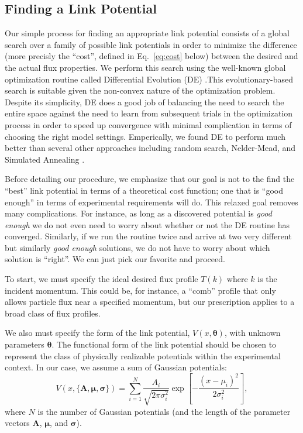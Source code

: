\documentclass[twocolumn,amsmath,amssymb,showpacs,prl,superscriptaddress,aps]{revtex4-1}
\begin{document}
\subsection{Finding a Link Potential}
Our simple process for finding an appropriate link potential consists of a global search over a family of possible link potentials in order to minimize the difference (more precisly the ``cost'', defined in Eq.~\eqref{eq:cost} below) between the desired and the actual flux properties. We perform this search using the well-known global optimization routine called Differential Evolution (DE) \cite{original DE paper}.This evolutionary-based search is suitable given the non-convex nature of the optimization problem. Despite its simplicity, DE does a good job of balancing the need to search the entire space against the need to learn from subsequent trials in the optimization process in order to speed up convergence with minimal complication in terms of choosing the right model settings. Emperically, we found DE to perform much better than several other approaches including random search, Nelder-Mead, and Simulated Annealing \cite{Tests performed using mathematica}.

Before detailing our procedure, we emphasize that our goal is not to the find the ``best'' link potential in terms of a theoretical cost function; one that is ``good enough'' in terms of experimental requirements will do. This relaxed goal removes many complications. For instance, as long as a discovered potential is {\it good enough} we do not even need to worry about whether or not the DE routine has converged. Similarly, if we run the routine twice and arrive at two very different but similarly {\it good enough} solutions, we do not have to worry about which solution is ``right''. We can just pick our favorite and proceed.

To start, we must specify the ideal desired flux profile $T(k)$ where $k$ is the incident momentum. This could be, for instance, a ``comb'' profile that only allows particle flux near a specified momentum, but our prescription applies to a broad class of flux profiles.

We also must specify the form of the link potential, $V(x, \bm{\theta})$, with unknown parameters $\bm{\theta}$. The functional form of the link potential should be chosen to represent the class of physically realizable potentials within the experimental context. In our case, we assume a sum of Gaussian potentials:
\begin{equation}
V(x,\{\bm{A},\bm{\mu},\bm{\sigma} \}) = \sum_{i=1}^{N}\frac{A_i}{\sqrt{2\pi\sigma_i^2}}\exp\left[{-\frac{(x-\mu_i)^2}{2\sigma_i^2}}\right],
\end{equation}
where $N$ is the number of Gaussian potentials (and the length of the parameter vectors $\bm{A}$, $\bm{\mu}$, and $\bm{\sigma}$).
\end{document}
